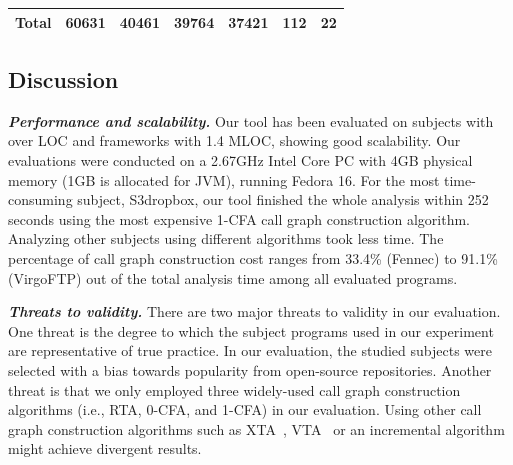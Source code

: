 \begin{table}[t]
\begin{center}
\begin{tabular}{|l||c|c|c|c|c|c|}
\hline
 \hline
 Total &  60631 &  40461 &  39764 &  37421 &  112 & 22 \\
 \hline
\end{tabular}
\end{center}
\vspace{-15pt}
\end{table}


\subsection{Discussion}

\noindent \textbf{\textit{Performance and scalability.}} Our tool
has been evaluated on \subnum subjects with over \totaloc LOC and frameworks
with 1.4 MLOC, showing good scalability. Our evaluations
were conducted on a 2.67GHz Intel Core PC with 4GB
physical memory (1GB is allocated for JVM), running Fedora 16.
For the most time-consuming subject, S3dropbox, our tool finished the whole analysis
within 252 seconds using the most expensive 1-CFA call graph construction
algorithm. Analyzing other subjects using different algorithms took less time.
The percentage of call graph construction cost ranges
from 33.4\% (Fennec) to 91.1\% (VirgoFTP) out of
the total analysis time among all evaluated programs.



\vspace{1mm}

\noindent \textbf{\textit{Threats to validity.}}
There are two major threats to validity in our evaluation. 
One threat is the degree to which the subject programs
used in our experiment are representative of true practice.
In our evaluation, the studied subjects were selected with a bias towards popularity from
open-source repositories. Another threat is that we only employed three
widely-used call graph construction algorithms (i.e., RTA, 0-CFA, and 1-CFA) 
in our evaluation. Using other 
call graph construction algorithms such as XTA~\cite{xta}, VTA~\cite{Sundaresan:2000} or
an incremental algorithm~\cite{inccg} might achieve divergent results.


